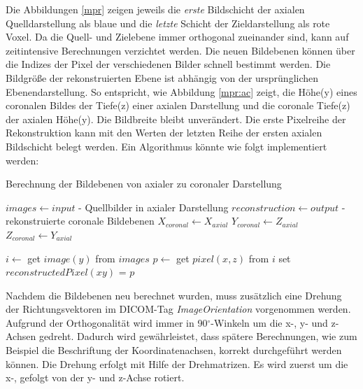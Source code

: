 Die Abbildungen \ref{mpr} zeigen jeweils die \textit{erste} Bildschicht der axialen Quelldarstellung als blaue und die \textit{letzte} Schicht der Zieldarstellung als rote Voxel. Da die Quell- und Zielebene immer orthogonal zueinander sind, kann auf zeitintensive Berechnungen verzichtet werden. Die neuen Bildebenen können über die Indizes der Pixel der verschiedenen Bilder schnell bestimmt werden. Die Bildgröße der rekonstruierten Ebene ist abhängig von der ursprünglichen Ebenendarstellung. So entspricht, wie Abbildung \ref{mpr:ac} zeigt, die Höhe(y) eines coronalen Bildes der Tiefe(z) einer axialen Darstellung und die coronale Tiefe(z) der axialen Höhe(y). Die Bildbreite bleibt unverändert. Die erste Pixelreihe der Rekonstruktion kann mit den Werten der letzten Reihe der ersten axialen Bildschicht belegt werden. Ein Algorithmus könnte wie folgt implementiert werden:

\begin{algorithm}
\caption{Berechnung der Bildebenen von axialer zu coronaler Darstellung}
\begin{algorithmic}[1] 
\STATE $images \leftarrow input$ - Quellbilder in axialer Darstellung
\STATE $reconstruction \leftarrow output$ - rekonstruierte coronale Bildebenen
\STATE $X_{coronal} \leftarrow X_{axial}$
\STATE $Y_{coronal} \leftarrow Z_{axial}$
\STATE $Z_{coronal} \leftarrow Y_{axial}$

        	\STATE $i \leftarrow$  get $image(y)$ from $images$ 
        	\STATE $p \leftarrow$ get $pixel(x, z)$ from $i$ 
            \STATE set $reconstructedPixel(xy)$ = $p$
        \ENDFOR
    \ENDFOR
\ENDFOR

\end{algorithmic}
\label{mpr_algo}
\end{algorithm}

Nachdem die Bildebenen neu berechnet wurden, muss zusätzlich eine Drehung der Richtungsvektoren im DICOM-Tag \textit{ImageOrientation} vorgenommen werden. Aufgrund der Orthogonalität wird immer in 90$^\circ$-Winkeln um die x-, y- und z-Achsen gedreht. Dadurch wird gewährleistet, dass spätere Berechnungen, wie zum Beispiel die Beschriftung der Koordinatenachsen, korrekt durchgeführt werden können.
Die Drehung erfolgt mit Hilfe der Drehmatrizen. Es wird zuerst um die x-, gefolgt von der y- und z-Achse rotiert.

